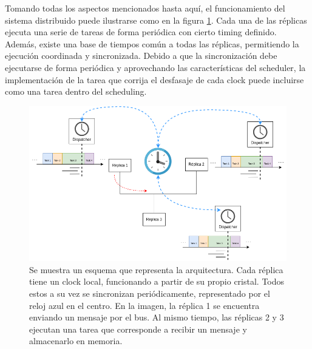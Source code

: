 Tomando todas los aspectos mencionados hasta aquí, el funcionamiento del sistema distribuido puede ilustrarse como en la figura \ref{fig:diagrama_TTA}. Cada una de las réplicas ejecuta una serie de tareas de forma periódica con cierto timing definido. Además, existe una base de tiempos común a todas las réplicas, permitiendo la ejecución coordinada y sincronizada. Debido a que la sincronización debe ejecutarse de forma periódica y aprovechando las características del scheduler, la implementación de la tarea que corrija el desfasaje de cada clock puede incluirse como una tarea dentro del scheduling.


\begin{figure}[!t]
    \centering
    \includegraphics[width=\textwidth]{img/diagrama_TTA.png}
    \caption{Se muestra un esquema que representa la arquitectura. Cada réplica tiene un clock local, funcionando a partir de su propio cristal. Todos estos a su vez se sincronizan periódicamente, representado por el reloj azul en el centro. En la imagen, la réplica 1 se encuentra enviando un mensaje por el bus. Al mismo tiempo, las réplicas 2 y 3 ejecutan una tarea que corresponde a recibir un mensaje y almacenarlo en memoria.}
    \label{fig:diagrama_TTA}
\end{figure}






